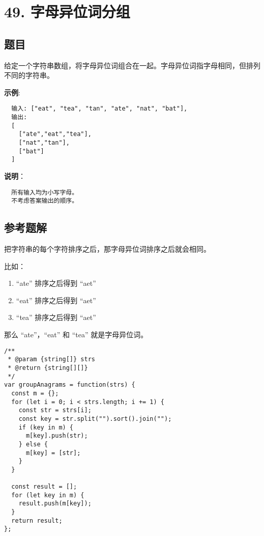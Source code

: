 \newpage
\section{49. 字母异位词分组}
\label{leetcode:49}

\subsection{题目}

给定一个字符串数组，将字母异位词组合在一起。字母异位词指字母相同，但排列不同的字符串。

\textbf{示例}:

\begin{verbatim}
  输入: ["eat", "tea", "tan", "ate", "nat", "bat"],
  输出:
  [
    ["ate","eat","tea"],
    ["nat","tan"],
    ["bat"]
  ]
\end{verbatim}

\textbf{说明}：

\begin{verbatim}
  所有输入均为小写字母。
  不考虑答案输出的顺序。
\end{verbatim}

\subsection{参考题解}

把字符串的每个字符排序之后，那字母异位词排序之后就会相同。

比如：

\begin{enumerate}
  \item ``ate'' 排序之后得到 ``aet''
  \item ``eat'' 排序之后得到 ``aet''
  \item ``tea'' 排序之后得到 ``aet''
\end{enumerate}

那么 ``ate''，``eat'' 和 ``tea'' 就是字母异位词。

\begin{verbatim}
/**
 * @param {string[]} strs
 * @return {string[][]}
 */
var groupAnagrams = function(strs) {
  const m = {};
  for (let i = 0; i < strs.length; i += 1) {
    const str = strs[i];
    const key = str.split("").sort().join("");
    if (key in m) {
      m[key].push(str);
    } else {
      m[key] = [str];
    }
  }

  const result = [];
  for (let key in m) {
    result.push(m[key]);
  }
  return result;
};
\end{verbatim}